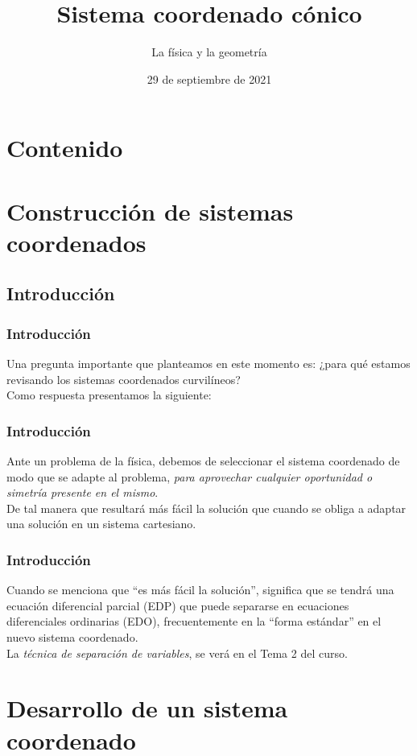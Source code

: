 \documentclass[12pt]{beamer}
\date{29 de septiembre de 2021}
\title{Sistema coordenado cónico}
\subtitle{La física y la geometría}
\begin{document}
\maketitle
\fontsize{14}{14}\selectfont
{}

\section*{Contenido}

\section{Construcción de sistemas coordenados}
\subsection{Introducción}

\begin{frame}
\frametitle{Introducción}
Una pregunta importante que planteamos en este momento es: ¿para qué estamos revisando los sistemas coordenados curvilíneos?
\\
\bigskip
\pause
Como respuesta presentamos la siguiente:
\end{frame}
\begin{frame}
\frametitle{Introducción}
Ante un problema de la física, debemos de seleccionar el sistema coordenado de modo que se adapte al problema, \emph{para aprovechar cualquier oportunidad o simetría presente en el mismo}.
\\
\bigskip
\pause
De tal manera que resultará más fácil la solución que cuando se obliga a adaptar una solución en un sistema cartesiano.
\end{frame}
\begin{frame}
\frametitle{Introducción}
Cuando se menciona que \enquote{es más fácil la solución}, significa que se tendrá una ecuación diferencial parcial (EDP) que puede separarse en ecuaciones diferenciales ordinarias (EDO), frecuentemente en la \enquote{forma estándar} en el nuevo sistema coordenado.
\\
\bigskip
\pause
La \emph{técnica de separación de variables}, se verá en el Tema 2 del curso.
\end{frame}

\section{Desarrollo de un sistema coordenado}
\end{document}
